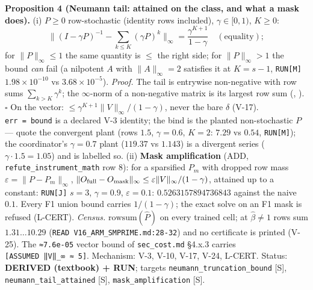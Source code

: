 \documentclass[11pt,a4paper]{article}
\theoremstyle{plain}
\theoremstyle{definition}
\theoremstyle{remark}
\begin{document}
\textbf{Proposition 4 (Neumann tail: attained on the class, and what a
mask does).} (i) \(P\ge0\) row-stochastic (identity rows included),
\(\gamma\in[0,1)\), \(K\ge0\):
\[\Big\|(I-\gamma P)^{-1}-\sum_{k\le K}(\gamma P)^k\Big\|_\infty=\frac{\gamma^{K+1}}{1-\gamma}\quad(\text{equality});\]
for \(\|P\|_\infty\le1\) the same quantity is \(\le\) the right side;
for \(\|P\|_\infty>1\) the bound \emph{can} fail (a nilpotent \(A\) with
\(\|A\|_\infty=2\) satisfies it at \(K=s-1\), \texttt{RUN{[}M{]}}
\(1.98\times10^{-10}\) vs \(3.68\times10^{-5}\)). \emph{Proof.} The tail
is entrywise non-negative with row sums \(\sum_{k>K}\gamma^k\); the
\(\infty\)-norm of a non-negative matrix is its largest row sum
(\citep{meyer-2000-matrix}, \citep{horn-2013-matrix}). \(\square\) On
the vector: \(\le\gamma^{K+1}\|V\|_\infty/(1-\gamma)\), never the bare
\(\delta\) (V-17). \texttt{err\ =\ bound} is a declared V-3 identity;
the bind is the planted non-stochastic \(P\) --- quote the convergent
plant (rows \(1.5\), \(\gamma=0.6\), \(K=2\): \(7.29\) vs \(0.54\),
\texttt{RUN{[}M{]}}); the coordinator's \(\gamma=0.7\) plant (\(119.37\)
vs \(1.143\)) is a divergent series (\(\gamma\cdot1.5=1.05\)) and is
labelled so. (ii) \textbf{Mask amplification} (ADD,
\texttt{refute\_instrument\_math} row 8): for a sparsified \(P_m\) with
dropped row mass \(\varepsilon=\|P-P_m\|_\infty\),
\(\|O_{\rm full}-O_{\rm mask}\|_\infty\le\varepsilon\|V\|_\infty/(1-\gamma)\),
attained up to a constant: \texttt{RUN{[}J{]}} \(s=3\), \(\gamma=0.9\),
\(\varepsilon=0.1\): \(0.5263157894736843\) against the naive \(0.1\).
Every F1 union bound carries \(1/(1-\gamma)\); the exact solve on an F1
mask is refused (L-CERT). \emph{Census.} \(\mathrm{rowsum}(\hat P)\) on
every trained cell; at \(\hat\beta\ne1\) rows sum \(1.31\dots10.29\)
(\texttt{READ\ V16\_ARM\_SMPRIME.md:28-32}) and no certificate is
printed (V-25). The \texttt{≈7.6e-05} vector bound of
\texttt{sec\_cost.md} §4.x.3 carries
\texttt{{[}ASSUMED\ ‖V‖\_∞\ ≈\ 5{]}}. Mechanism: V-3, V-10, V-17, V-24,
L-CERT. Status: \textbf{DERIVED (textbook) + RUN}; targets
\texttt{neumann\_truncation\_bound} {[}S{]},
\texttt{neumann\_tail\_attained} {[}S{]}, \texttt{mask\_amplification}
{[}S{]}.
\end{document}
